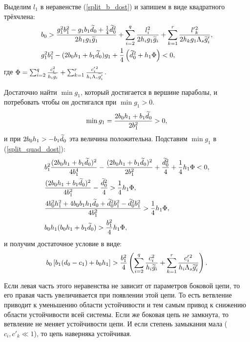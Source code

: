 Выделим \(l_1\) в неравенстве (\ref{split_b_dost}) и запишем в виде квадратного трёхчлена:
\begin{equation} \label{split_quad_dost}
    \begin{split}
        &b_0 > \frac{g_1^2 b_1^2 - g_1 b_1 \widetilde{d}_0 + \frac{1}{4} \widetilde{d}_0^2 }{2h_1 g_1 \widetilde{g}_1} + \sum_{i=2}^{q} \frac{l^2_i}{2h_i g_1 \widetilde{g}_i} + \sum_{k=1}^{r} \frac{l'{}^2_k}{2h_k g_1 \Lambda_s \widetilde{g}'_i}, \\
        &g_1^2 b_1^2 - (2b_0 h_1 + b_1 \widetilde{d}_0) g_1 + \frac{1}{4} \left(\widetilde{d}_0^2 + h_1 \Phi \right) < 0,
    \end{split}
\end{equation}
где \( \Phi = \sum_{i=2}^{q} \frac{c_i^2}{h_i \widetilde{g}_i} + \sum_{k=1}^{r} \frac{c'_i{}^2}{h_i \Lambda_s \widetilde{g}'_i} \).

Достаточно найти \(\min g_1\), который достигается в вершине параболы, и потребовать чтобы он достигался при \(\min g_1 > 0\).
\begin{equation}
    \min g_1 = \frac{2b_0 h_1 + b_1 \widetilde{d}_0}{2 b_1^2} > 0,
\end{equation}
и при \(2b_0 h_1 > - b_1 \widetilde{d}_0\) эта величина положительна. Подставим \(\min g_1\) в (\ref{split_quad_dost}):
\begin{equation*}
    \begin{split}
        & b_1^2 \frac{(2b_0 h_1 + b_1 \widetilde{d}_0)^2}{4 b_1^4} - \frac{(2b_0 h_1 + b_1 \widetilde{d}_0)^2}{2 b_1^2} + \frac{\widetilde{d}_0^2}{4} + \frac{1}{4} h_1 \Phi < 0, \\
        & \frac{(2b_0 h_1 + b_1 \widetilde{d}_0)^2}{4 b_1^2} - \frac{\widetilde{d}_0^2}{4} > \frac{1}{4} h_1 \Phi, \\
        & \frac{4 b_0^2 h_1^2 + 4 b_0 b_1 h_1 \widetilde{d}_0 + \widetilde{d}_0^2 b_1^2 - \widetilde{d}_0^2 b_1^2}{4 b_1^2} > \frac{1}{4} h_1 \Phi, \\
        & b_0 h_1 (b_0 h_1 + b_1 \widetilde{d}_0) > \frac{b_1^2}{4} h_1 \Phi,
    \end{split}
\end{equation*}
и получим достаточное условие в виде:
\begin{equation} \label{split_h_dost}
    b_0 \left[ b_1 (d_0 - c_1) + b_0 h_1 \right] > \frac{b_1^2}{4} \left( \sum_{i=2}^{q} \frac{c_i^2}{h_i \widetilde{g}_i} + \sum_{k=1}^{r} \frac{c'_i{}^2}{h_i \Lambda_s \widetilde{g}'_i} \right).
\end{equation}

Если левая часть этого неравенства не зависит от параметров боковой цепи, то его правая часть увеличивается при появлении этой цепи. То есть ветвление приводит к уменьшению области устойчивости и тем самым привод к снижению области устойчивости всей системы. Если же боковая цепь не замкнута, то ветвление не меняет устойчивости цепи. И если степень замыкания мала (\(c_i, c'_k \ll 1\)), то цепь наверняка устойчивая.

